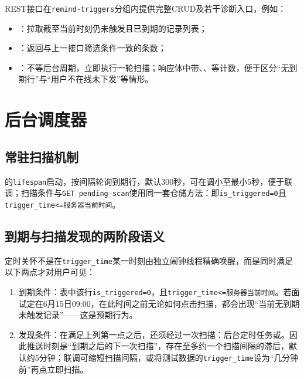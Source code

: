 \documentclass{base}
\newcommand{\id}[1]{\path{#1}}
\begin{document}
REST接口在\texttt{remind-triggers}分组内提供完整CRUD及若干诊断入口，例如：
\begin{itemize}\setlength{\itemsep}{2pt}\setlength{\parsep}{0pt}
    \item {}：拉取截至当前时刻仍未触发且已到期的记录列表；
    \item {}：返回与上一接口筛选条件一致的条数；
    \item {}：不等后台周期，立即执行一轮扫描；响应体中带、、等计数，便于区分``无到期行''与``用户不在线未下发''等情形。
\end{itemize}

\section{后台调度器}

\subsection{常驻扫描机制}

的\texttt{lifespan}启动，按间隔轮询到期行，默认300秒，可在调小至最小5秒，便于联调；扫描条件与\texttt{GET pending-scan}使用同一套仓储方法\id{list_pending_before}：即\texttt{is\_triggered=0}且\texttt{trigger\_time<=服务器当前时间}。

\subsection{到期与扫描发现的两阶段语义}\label{sec:two_phase}

定时关怀不是在\texttt{trigger\_time}某一时刻由独立闹钟线程精确唤醒，而是同时满足以下两点才对用户可见：

\begin{enumerate}
    \item 到期条件：表中该行\texttt{is\_triggered=0}，且\texttt{trigger\_time<=服务器当前时间}。若面试定在6月15日09:00，在此时间之前无论如何点击扫描，都会出现``当前无到期未触发记录''——这是预期行为。
    \item 发现条件：在满足上列第一点之后，还须经过一次扫描：后台定时任务或。因此推送时刻是``到期之后的下一次扫描''，存在至多约一个扫描间隔的滞后，默认约5分钟；联调可缩短扫描间隔，或将测试数据的\texttt{trigger\_time}设为``几分钟前''再点立即扫描。
\end{enumerate}
\end{document}
